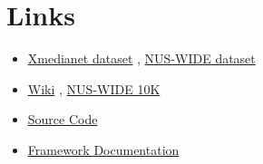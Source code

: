 \section{Links}
    \begin{itemize}
        \item \href{https://drive.google.com/file/d/1OYv7IK5OdDmBQ_pRXMugnqZzR_j7HOsu/view?usp=sharing}{Xmedianet dataset}
        , \href{https://lms.comp.nus.edu.sg/wp-content/uploads/2019/research/nuswide/NUS-WIDE.html}{NUS-WIDE dataset}
        \item \href{https://github.com/shivangibithel/ACMR_demo/tree/master/data}{Wiki}
        , \href{https://github.com/shivangibithel/ACMR_demo/tree/master/data}{NUS-WIDE 10K}
        \item \href{https://github.com/Prabhat1808/Multimodal-IR-Ablation}{Source Code}
        \item \href{https://www.cse.iitd.ac.in/~cs5170407/}{Framework Documentation}
    \end{itemize}
